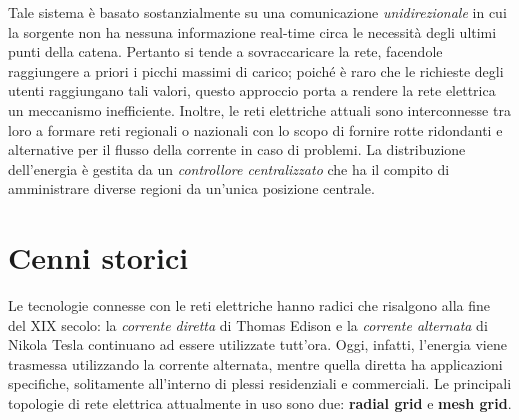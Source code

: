\newline Tale sistema è basato sostanzialmente su una comunicazione \textit{unidirezionale} in cui la sorgente non ha nessuna informazione real-time circa le necessità degli ultimi punti della catena. Pertanto si tende a sovraccaricare la rete, facendole raggiungere a priori i picchi massimi di carico; poiché è raro che le richieste degli utenti raggiungano tali valori, questo approccio porta a rendere la rete elettrica un meccanismo inefficiente.
\newline
Inoltre, le reti elettriche attuali sono interconnesse tra loro a formare reti regionali o nazionali con lo scopo di fornire rotte ridondanti e alternative per il flusso della corrente in caso di problemi. \newline
La distribuzione dell'energia è gestita da un \textit{controllore centralizzato} che ha il compito di amministrare diverse regioni da un'unica posizione centrale. 
\newpage
\section{Cenni storici}
Le tecnologie connesse con le reti elettriche hanno radici che risalgono alla fine del XIX secolo: la \textit{corrente diretta} di Thomas Edison e la \textit{corrente alternata} di Nikola Tesla continuano ad essere utilizzate tutt'ora. Oggi, infatti, l'energia viene trasmessa utilizzando la corrente alternata, mentre quella diretta ha applicazioni specifiche, solitamente all'interno di plessi residenziali e commerciali. \newline \newline
Le principali topologie di rete elettrica attualmente in uso sono due: \textbf{radial grid} e \textbf{mesh grid}.


